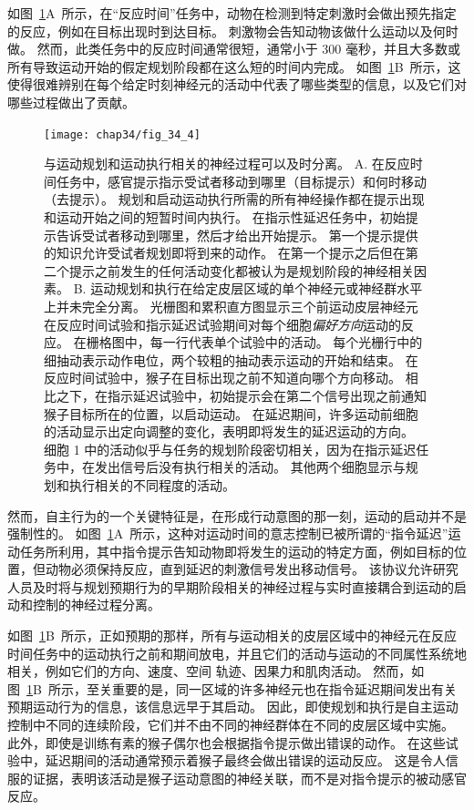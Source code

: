 如图~\ref{fig:34_4}A~所示，在“反应时间”任务中，动物在检测到特定刺激时会做出预先指定的反应，例如在目标出现时到达目标。
刺激物会告知动物该做什么运动以及何时做。
然而，此类任务中的反应时间通常很短，通常小于 300 毫秒，并且大多数或所有导致运动开始的假定规划阶段都在这么短的时间内完成。
如图~\ref{fig:34_4}B~所示，这使得很难辨别在每个给定时刻神经元的活动中代表了哪些类型的信息，以及它们对哪些过程做出了贡献。


\begin{figure}[htbp]
	\centering
	\texttt{[image: chap34/fig\_34\_4]}
	\caption{与运动规划和运动执行相关的神经过程可以及时分离\cite{crammond2000prior}。
		A. 在反应时间任务中，感官提示指示受试者移动到哪里（目标提示）和何时移动（去提示）。
		规划和启动运动执行所需的所有神经操作都在提示出现和运动开始之间的短暂时间内执行。
		在指示性延迟任务中，初始提示告诉受试者移动到哪里，然后才给出开始提示。
		第一个提示提供的知识允许受试者规划即将到来的动作。
		在第一个提示之后但在第二个提示之前发生的任何活动变化都被认为是规划阶段的神经相关因素。
		B. 运动规划和执行在给定皮层区域的单个神经元或神经群水平上并未完全分离。
		光栅图和累积直方图显示三个前运动皮层神经元在反应时间试验和指示延迟试验期间对每个细胞\textit{偏好方向}运动的反应。
		在栅格图中，每一行代表单个试验中的活动。
		每个光栅行中的细抽动表示动作电位，两个较粗的抽动表示运动的开始和结束。
		在反应时间试验中，猴子在目标出现之前不知道向哪个方向移动。
		相比之下，在指示延迟试验中，初始提示会在第二个信号出现之前通知猴子目标所在的位置，以启动运动。
		在延迟期间，许多运动前细胞的活动显示出定向调整的变化，表明即将发生的延迟运动的方向。
		细胞 1 中的活动似乎与任务的规划阶段密切相关，因为在指示延迟任务中，在发出信号后没有执行相关的活动。
		其他两个细胞显示与规划和执行相关的不同程度的活动。}
	\label{fig:34_4}
\end{figure}


然而，自主行为的一个关键特征是，在形成行动意图的那一刻，运动的启动并不是强制性的。
如图~\ref{fig:34_4}A~所示，这种对运动时间的意志控制已被所谓的“指令延迟”运动任务所利用，其中指令提示告知动物即将发生的运动的特定方面，例如目标的位置，但动物必须保持反应，直到延迟的刺激信号发出移动信号。
该协议允许研究人员及时将与规划预期行为的早期阶段相关的神经过程与实时直接耦合到运动的启动和控制的神经过程分离。


如图~\ref{fig:34_4}B~所示，正如预期的那样，所有与运动相关的皮层区域中的神经元在反应时间任务中的运动执行之前和期间放电，并且它们的活动与运动的不同属性系统地相关，例如它们的方向、速度、空间 轨迹、因果力和肌肉活动。
然而，如图~\ref{fig:34_4}B~所示，至关重要的是，同一区域的许多神经元也在指令延迟期间发出有关预期运动行为的信息，该信息远早于其启动。
因此，即使规划和执行是自主运动控制中不同的连续阶段，它们并不由不同的神经群体在不同的皮层区域中实施。
此外，即使是训练有素的猴子偶尔也会根据指令提示做出错误的动作。
在这些试验中，延迟期间的活动通常预示着猴子最终会做出错误的运动反应。
这是令人信服的证据，表明该活动是猴子运动意图的神经关联，而不是对指令提示的被动感官反应。



